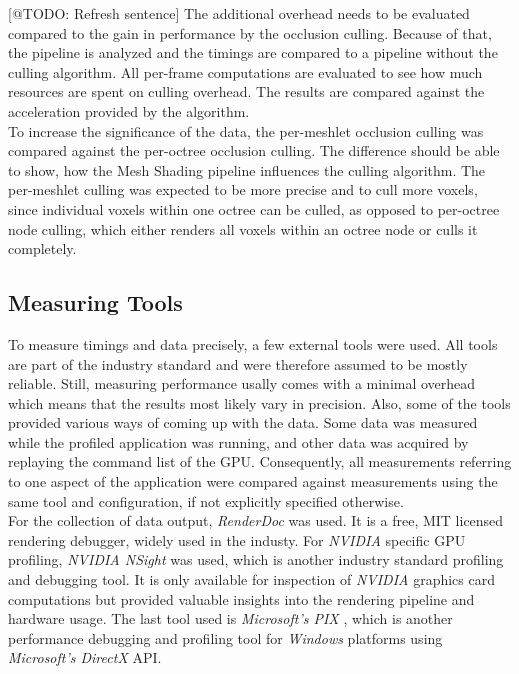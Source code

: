 [@TODO: Refresh sentence]
The additional overhead needs to be evaluated compared to the gain in performance by the occlusion culling. 
Because of that, the pipeline is analyzed and the timings are compared to a pipeline without the culling 
algorithm. All per-frame computations are evaluated to see how much resources are spent on culling overhead. 
The results are compared against the acceleration provided by the algorithm.\\

\noindent
To increase the significance of the data, the per-meshlet occlusion culling was compared against the 
per-octree occlusion culling. The difference should be able to show, how the Mesh Shading pipeline 
influences the culling algorithm. The per-meshlet culling was expected to be more precise and to cull 
more voxels, since individual voxels within one octree can be culled, as opposed to per-octree node 
culling, which either renders all voxels within an octree node or culls it completely. 


\subsection*{Measuring Tools} \label{subsec-measuring-tools}

To measure timings and data precisely, a few external tools were used. All tools are part of the industry 
standard and were therefore assumed to be mostly reliable. Still, measuring performance usally comes with 
a minimal overhead which means that the results most likely vary in precision. Also, some of the tools 
provided various ways of coming up with the data. Some data was measured while the profiled application 
was running, and other data was acquired by replaying the command list of the \ac{GPU}. Consequently, all 
measurements referring to one aspect of the application were compared against measurements using the same 
tool and configuration, if not explicitly specified otherwise. \\

\noindent
For the collection of data output, \emph{RenderDoc} \cite{RenderDoc} was used. It is a free, MIT licensed 
rendering debugger, widely used in the industy. For \emph{NVIDIA} specific \ac{GPU} profiling, \emph{NVIDIA NSight} 
\cite{NSight} was used, which is another industry standard profiling and debugging tool. It is only available for 
inspection of \emph{NVIDIA} graphics card computations but provided valuable insights into the rendering pipeline 
and hardware usage. The last tool used is \emph{Microsoft's PIX} \cite{PIX}, which is another performance debugging 
and profiling tool for \emph{Windows} platforms using \emph{Microsoft's DirectX} \ac{API}. \\

